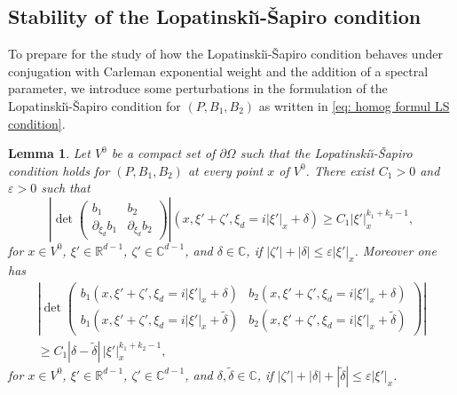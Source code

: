\documentclass[JEP,XML,SOM,Unicode,published]{cedram}
\theoremstyle{plain}
\newtheorem{lemma}[theorem]{Lemma}
\theoremstyle{definition}
\def\R{\mathbb{R}}
\def\C{\mathbb{C}}
\newcommand{\LS}{Lopatinski\u{\i}-\v{S}apiro\xspace}
\let\eps\varepsilon
\begin{document}
\subsection{Stability of the \LS condition}
\label{sec: Stability LS}
To prepare for the study of how the \LS condition behaves under
conjugation with Carleman exponential weight and the addition of a
spectral parameter, we introduce some perturbations in the formulation
of the \LS condition for $(P, B_1, B_2)$ as written in \eqref{eq:
homog formul LS condition}.

\begin{lemma}
\label{lemma: perturbation LS}
Let $V^0$ be a compact set of $\partial\Omega$ such that the \LS
condition holds for $(P, B_1, B_2)$ at every point $x$ of $V^0$. There exist $C_1>0$
and $\eps>0$ such that
\begin{equation}\label{eq: LS + perturbation-1}
\left|\det
\begin{pmatrix}
b_1
&b_2\\[
2pt]
\partial_{\xi_d}b_1
& \partial_{\xi_d}b_2
\end{pmatrix}\right|(x,\xi' + \zeta', \xi_d = i |\xi'|_x+ \delta)
\geq C_1 |\xi'|_x^{k_1+k_2 -1},
\end{equation}
for $x \in V^0$, $\xi' \in \R^{d-1}$, $\zeta' \in \C^{d-1}$, and $\delta \in \C$, if $|\zeta'| + |\delta| \leq \eps |\xi'|_x$.
Moreover one has
\begin{multline}\label{eq: LS + perturbation-2}
\left|\det
\begin{pmatrix}
b_1 (x,\xi' + \zeta', \xi_d = i |\xi'|_x+ \delta)
&b_2 (x,\xi' + \zeta', \xi_d = i |\xi'|_x+ \delta)\\[
4pt]
b_1 (x,\xi' + \zeta', \xi_d = i |\xi'|_x+ \tilde{\delta})
& b_2 (x,\xi' + \zeta', \xi_d = i |\xi'|_x+ \tilde{\delta})
\end{pmatrix}\right|\\
\geq C_1 |\delta - \tilde{\delta}|\, |\xi'|_x^{k_1+k_2 -1},
\end{multline}
for $x \in V^0$, $\xi' \in \R^{d-1}$, $\zeta' \in \C^{d-1}$, and $\delta, \tilde{\delta}\in \C$,
if $|\zeta'| + |\delta| + |\tilde{\delta}|\leq \eps |\xi'|_x$.
\end{lemma}
\end{document}
